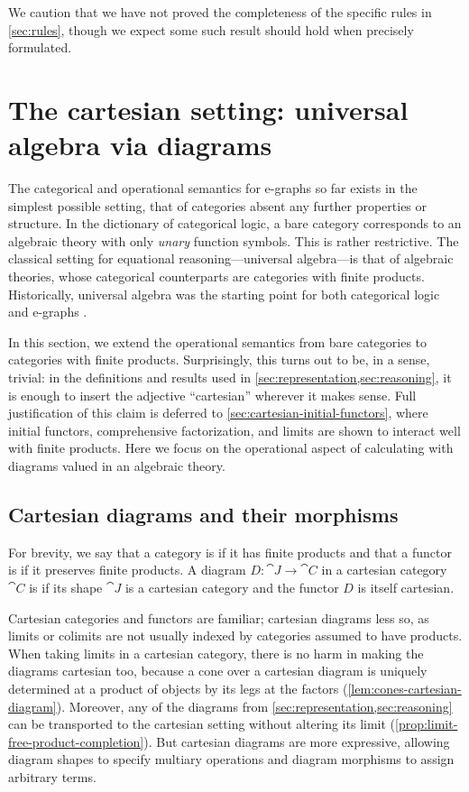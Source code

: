 \documentclass[11pt]{article}
\numberwithin{equation}{section}
\begin{document}
We caution that we have not proved the completeness of the specific rules in
\cref{sec:rules}, though we expect some such result should hold when precisely
formulated.

\section{The cartesian setting: universal algebra via diagrams}
\label{sec:cartesian-setting}

The categorical and operational semantics for e-graphs so far exists in the
simplest possible setting, that of categories absent any further properties or
structure. In the dictionary of categorical logic, a bare category corresponds
to an algebraic theory with only \emph{unary} function symbols. This is rather
restrictive. The classical setting for equational reasoning---universal
algebra---is that of algebraic theories, whose categorical counterparts are
categories with finite products. Historically, universal algebra was the
starting point for both categorical logic \cite{lawvere1963} and e-graphs
\cite{nelson1980}.

In this section, we extend the operational semantics from bare categories to
categories with finite products. Surprisingly, this turns out to be, in a sense,
trivial: in the definitions and results used in
\cref{sec:representation,sec:reasoning}, it is enough to insert the adjective
``cartesian'' wherever it makes sense. Full justification of this claim is
deferred to \cref{sec:cartesian-initial-functors}, where initial functors,
comprehensive factorization, and limits are shown to interact well with finite
products. Here we focus on the operational aspect of calculating with diagrams
valued in an algebraic theory.

\subsection{Cartesian diagrams and their morphisms}

For brevity, we say that a category is  if it has finite
products and that a functor is  if it preserves finite
products. A diagram $D: \cat{J} \to \cat{C}$ in a cartesian category $\cat{C}$
is  if its shape $\cat{J}$ is a cartesian category and the
functor $D$ is itself cartesian.

Cartesian categories and functors are familiar; cartesian diagrams less so, as
limits or colimits are not usually indexed by categories assumed to have
products. When taking limits in a cartesian category, there is no harm in making
the diagrams cartesian too, because a cone over a cartesian diagram is
uniquely determined at a product of objects by its legs at the factors
(\cref{lem:cones-cartesian-diagram}). Moreover, any of the diagrams from
\cref{sec:representation,sec:reasoning} can be transported to the cartesian
setting without altering its limit (\cref{prop:limit-free-product-completion}).
But cartesian diagrams are more expressive, allowing diagram shapes to specify
multiary operations and diagram morphisms to assign arbitrary terms.
\end{document}
